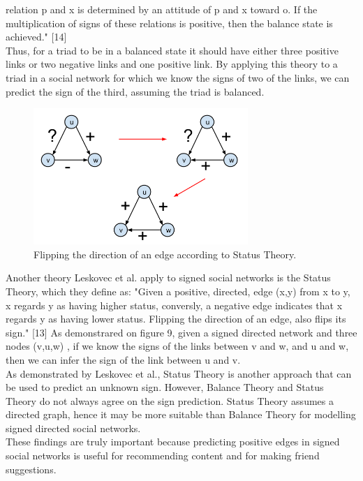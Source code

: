 \documentclass[conference,letterpaper]{IEEEtran}
\begin{document}
relation p and x is determined by an attitude of p and x toward o. If the multiplication of signs of these
relations is positive, then the balance state is achieved." [14] \\
Thus, for a triad to be in a balanced state it should have either three positive links or two negative links
and one positive link. By applying this theory to a triad in a social network for which we know the signs of
two of the links, we can predict the sign of the third, assuming the triad is balanced.\\
\begin{center}
\begin{figure}[hb]
\centering
\includegraphics[width=3.2in]{status_theory}
\caption{
Flipping the direction of an edge according to Status Theory.
}
\label{fig_sim10}
\end{figure}
\end{center}
Another theory Leskovec et al. apply to signed social networks is the Status Theory, which they define as:
"Given a positive, directed, edge (x,y) from x to y, x regards y as having higher status, conversly, a
negative edge indicates that x regards y as having lower status. Flipping the direction of an edge, also
flips its sign." [13] As demonstrared on figure 9, given a signed directed network and three nodes (v,u,w) ,
if we know the signs of the links between v and w, and u and w, then we can infer the sign of the link 
between u and v. \\
As demonstrated by Leskovec et al., Status Theory is another approach that can be used to predict an
unknown sign. However, Balance Theory and Status Theory do not always agree on the sign prediction.
Status Theory assumes a directed graph, hence it may be more suitable than Balance Theory for modelling
signed directed social networks.\\
These findings are truly important because predicting positive edges in signed social networks is useful
for recommending content and for making friend suggestions.\\
\end{document}
